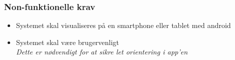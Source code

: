 \subsubsection{Non-funktionelle krav}

\begin{itemize}
\item Systemet skal visualiseres på en smartphone eller tablet med android 
\item Systemet skal være brugervenligt
	\\
	\textit{Dette er nødvendigt for at sikre let orientering i app'en}
\end{itemize}



%
%
